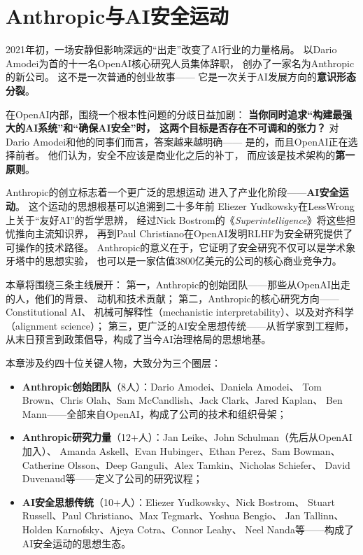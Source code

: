 
\chapter{Anthropic与AI安全运动}
\label{ch:anthropic}

2021年初，一场安静但影响深远的``出走''改变了AI行业的力量格局。
以Dario Amodei为首的十一名OpenAI核心研究人员集体辞职，
创办了一家名为Anthropic的新公司。
这不是一次普通的创业故事——
它是一次关于AI发展方向的\textbf{意识形态分裂}。

在OpenAI内部，围绕一个根本性问题的分歧日益加剧：
\textbf{当你同时追求``构建最强大的AI系统''和``确保AI安全''时，
这两个目标是否存在不可调和的张力？}
对Dario Amodei和他的同事们而言，答案越来越明确——
是的，而且OpenAI正在选择前者。
他们认为，安全不应该是商业化之后的补丁，
而应该是技术架构的\textbf{第一原则}。

Anthropic的创立标志着一个更广泛的思想运动
进入了产业化阶段——\textbf{AI安全运动}。
这个运动的思想根基可以追溯到二十多年前
Eliezer Yudkowsky在LessWrong上关于``友好AI''的哲学思辨，
经过Nick Bostrom的《\textit{Superintelligence}》将这些担忧推向主流知识界，
再到Paul Christiano在OpenAI发明RLHF为安全研究提供了可操作的技术路径。
Anthropic的意义在于，它证明了安全研究不仅可以是学术象牙塔中的思想实验，
也可以是一家估值3800亿美元的公司的核心商业竞争力。

本章将围绕三条主线展开：
第一，Anthropic的创始团队——那些从OpenAI出走的人，他们的背景、
动机和技术贡献；
第二，Anthropic的核心研究方向——Constitutional AI、
机械可解释性（mechanistic interpretability）、以及对齐科学（alignment science）；
第三，更广泛的AI安全思想传统——从哲学家到工程师，
从末日预言到政策倡导，构成了当今AI治理格局的思想地基。

\begin{corebox}[本章人物图谱]
本章涉及约四十位关键人物，大致分为三个圈层：
\begin{itemize}
  \item \textbf{Anthropic创始团队}（8人）：Dario Amodei、Daniela Amodei、
    Tom Brown、Chris Olah、Sam McCandlish、Jack Clark、Jared Kaplan、
    Ben Mann——全部来自OpenAI，构成了公司的技术和组织骨架；
  \item \textbf{Anthropic研究力量}（12+人）：Jan Leike、John Schulman（先后从OpenAI加入）、
    Amanda Askell、Evan Hubinger、Ethan Perez、Sam Bowman、
    Catherine Olsson、Deep Ganguli、Alex Tamkin、Nicholas Schiefer、
    David Duvenaud等——定义了公司的研究议程；
  \item \textbf{AI安全思想传统}（10+人）：Eliezer Yudkowsky、Nick Bostrom、
    Stuart Russell、Paul Christiano、Max Tegmark、Yoshua Bengio、
    Jan Tallinn、Holden Karnofsky、Ajeya Cotra、Connor Leahy、
    Neel Nanda等——构成了AI安全运动的思想生态。
\end{itemize}
\end{corebox}


